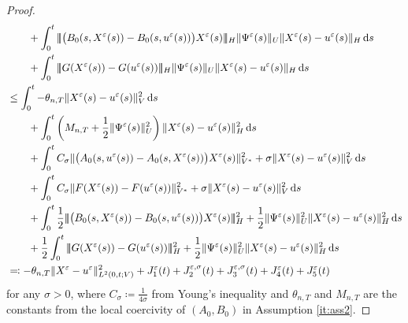 \documentclass{amsart}
\newcommand{\dd}{\,\mathrm{d}}
\newcommand{\<}{\langle}
\newcommand{\?}{\rangle}
\newcommand{\nn}{|\!|\!|}
\theoremstyle{plain}
\theoremstyle{remark}
\theoremstyle{plain}
\numberwithin{equation}{section}
\newcommand{\eps}{\varepsilon}
\begin{document}
\begin{proof}
\begin{align}
    &\qquad+\int_0^t \nn\big(B_0(s,X^\eps(s))-B_0(s,u^{\eps}(s))\big)X^\eps(s)\nn_H\|\Psi^\eps(s)\|_U\|X^\eps(s)-u^{\eps}(s)\|_H\dd s\notag\\
    &\qquad+\int_0^t\nn G(X^\eps(s))-G(u^{\eps}(s))\nn_H\|\Psi^\eps(s)\|_U \|X^\eps(s)-u^{\eps}(s)\|_H\dd s\notag\\
    &\leq \int_0^t -\theta_{n,T}\|X^\eps(s)-u^{\eps}(s)\|_V^2\dd s\notag\\
    &\qquad+\int_0^t \left(M_{n,T}+\frac{1}{2}\|\Psi^\eps(s)\|_U^2\right)\|X^\eps(s)-u^{\eps}(s)\|_H^2\dd s\notag\\
    &\qquad+ \int_0^tC_\sigma\|\big(A_0(s,u^{\eps}(s))-A_0(s,X^\eps(s))\big)X^\eps(s)\|_{V^*}^2+\sigma\|X^\eps(s)-u^{\eps}(s)\|_V^2\dd s\notag\\
    &\qquad + \int_0^tC_\sigma\|F(X^\eps(s))-F(u^{\eps}(s))\|_{V^*}^2+\sigma\|X^\eps(s)-u^{\eps}(s)\|_V^2\dd s\notag\\
    &\qquad+\int_0^t \frac{1}{2} \nn\big(B_0(s,X^\eps(s))-B_0(s,u^{\eps}(s))\big)X^\eps(s)\nn_H^2+\frac{1}{2}\|\Psi^\eps(s)\|_U^2\|X^\eps(s)-u^{\eps}(s)\|_H^2\dd s\notag\\
    &\qquad+\frac{1}{2}\int_0^t\nn G(X^\eps(s))-G(u^{\eps}(s))\nn_H^2+\frac{1}{2}\|\Psi^\eps(s)\|_U^2 \|X^\eps(s)-u^{\eps}(s)\|_H^2\dd s\notag\\
    &\eqqcolon  -\theta_{n,T}\|X^\eps-u^{\eps}\|_{L^2(0,t;V)}^2+{J}_{1}^{\eps}(t)+{J}_{2}^{\eps,\sigma}(t)+{J}_{3}^{\eps,\sigma}(t)+{J}_{4}^{\eps}(t)+{J}_{5}^{\eps}(t) \label{eq: prep 1 pointwise gronwall X^eps-u^psi}
    \end{align}
for any $\sigma>0$, where $C_\sigma\coloneqq \frac{1}{4\sigma}$ from Young's inequality and $\theta_{n,T}$ and $M_{n,T}$ are the constants from the local coercivity of $(A_0,B_0)$ in Assumption \ref{it:ass2}.


\end{proof}
\end{document}

